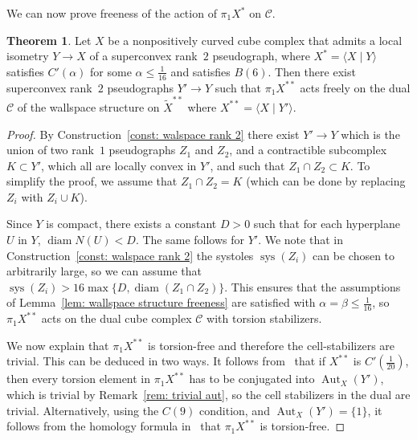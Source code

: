 \documentclass[12pt,oneside]{amsart}
\theoremstyle{definition}
\newtheorem{thm}{Theorem}[section]
\theoremstyle{definition}
\theoremstyle{remark}
\DeclareMathOperator{\diam}{\text{diam}}
\DeclareMathOperator{\sys}{\mathrm sys}
\DeclareMathOperator{\Aut}{Aut}
\begin{document}
We can now prove  freeness of the action of $\pi_1X^*$ on $\mathcal{C}$. 



\begin{thm}\label{thm:freeness}
Let $X$ be a nonpositively curved cube complex that admits a local isometry $Y\rightarrow X$ of a superconvex rank~$2$ pseudograph, where $X^*=\langle X \mid Y \rangle $ satisfies $C'(\alpha)$ for some $\alpha \leq \frac{1}{16}$ and satisfies  $B(6)$. Then there exist superconvex rank~$2$ pseudographs $Y'\to Y$ such that $\pi_1 X^{**}$ acts freely on the dual $\mathcal{C}$ of the wallspace structure on $\widetilde X^{**}$ where $X^{**} = \langle X \mid Y'\rangle$.
\end{thm}





\begin{proof}
By Construction~\ref{const: walspace rank 2} there exist $Y'\to Y$ which is the union of two rank~$1$ pseudographs $Z_1$ and $Z_2$, and a contractible subcomplex $K\subset Y'$, which all are locally convex in $Y'$, and such that $Z_1\cap Z_2 \subset K$. To simplify the proof, we assume that $Z_1\cap Z_2 = K$ (which can be done by replacing $Z_i$ with $Z_i\cup K$). 

Since $Y$ is compact, there exists a constant $D>0$ such that for each hyperplane $U$ in $Y$, $\diam N(U)<D$. The same follows for $Y'$. 
We note that in  Construction~\ref{const: walspace rank 2} the systoles $\sys(Z_i)$ can be chosen to arbitrarily large, so we can assume that $\sys(Z_i)> 16\max\{D, \diam(Z_1\cap Z_2)\}$. This ensures that the assumptions of Lemma~\ref{lem: wallspace structure freeness} are satisfied with $\alpha = \beta \leq\frac{1}{16}$, so $\pi_1X^{**}$ acts on the dual cube complex $\mathcal{C}$ with torsion stabilizers. 

We now explain that  $\pi_1X^{**}$ is torsion-free and therefore the cell-stabilizers are trivial. This can be deduced in two ways. It follows from~\cite[Thm~4.2 and Rmk~4.3]{WiseBook} that if $X^{**}$ is $C'(\frac{1}{20})$, then every torsion element in $\pi_1X^{**}$ has to be conjugated into $\Aut_X(Y')$, which is trivial by Remark~\ref{rem: trivial aut}, so the cell stabilizers in the dual are trivial. Alternatively,  using the $C(9)$ condition, and   $\Aut_X(Y')=\{1\}$, it follows from the homology formula in~\cite[Cor 1.6]{Arenas24asph} that $\pi_1X^{**}$ is torsion-free.
\end{proof}
\end{document}
